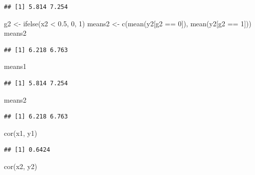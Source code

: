 \documentclass[
]{krantz}
\makeatletter
\newenvironment{Shaded}{\begin{snugshade}}{\end{snugshade}}
\newcommand{\DecValTok}[1]{\textcolor[rgb]{0.06,0.06,0.06}{#1}}
\newcommand{\FloatTok}[1]{\textcolor[rgb]{0.06,0.06,0.06}{#1}}
\newcommand{\FunctionTok}[1]{\textcolor[rgb]{0,0,0}{#1}}
\newcommand{\NormalTok}[1]{#1}
\newcommand{\OtherTok}[1]{\textcolor[rgb]{0.37,0.37,0.37}{#1}}
\newcommand{\SpecialCharTok}[1]{\textcolor[rgb]{0,0,0}{#1}}
\newenvironment{kframe}{%
\medskip{}
\setlength{\fboxsep}{.8em}
 \def\at@end@of@kframe{}%
 \ifinner\ifhmode%
  \def\at@end@of@kframe{\end{minipage}}%
  \begin{minipage}{\columnwidth}%
 \fi\fi%
 \def\FrameCommand##1{\hskip\@totalleftmargin \hskip-\fboxsep
 \colorbox{shadecolor}{##1}\hskip-\fboxsep
     \hskip-\linewidth \hskip-\@totalleftmargin \hskip\columnwidth}%
 \MakeFramed {\advance\hsize-\width
   \@totalleftmargin\z@ \linewidth\hsize
   \@setminipage}}%
 {\par\unskip\endMakeFramed%
 \at@end@of@kframe}
\renewenvironment{Shaded}{\begin{kframe}}{\end{kframe}}
\makeatother
\begin{document}
\begin{verbatim}
## [1] 5.814 7.254
\end{verbatim}

\begin{Shaded}
\begin{Highlighting}[]
\NormalTok{g2 }\OtherTok{\textless{}{-}} \FunctionTok{ifelse}\NormalTok{(x2 }\SpecialCharTok{\textless{}} \FloatTok{0.5}\NormalTok{, }\DecValTok{0}\NormalTok{, }\DecValTok{1}\NormalTok{)}
\NormalTok{means2 }\OtherTok{\textless{}{-}} \FunctionTok{c}\NormalTok{(}\FunctionTok{mean}\NormalTok{(y2[g2 }\SpecialCharTok{==} \DecValTok{0}\NormalTok{]), }\FunctionTok{mean}\NormalTok{(y2[g2 }\SpecialCharTok{==} \DecValTok{1}\NormalTok{]))}
\NormalTok{means2}
\end{Highlighting}
\end{Shaded}

\begin{verbatim}
## [1] 6.218 6.763
\end{verbatim}

\begin{Shaded}
\begin{Highlighting}[]
\NormalTok{means1}
\end{Highlighting}
\end{Shaded}

\begin{verbatim}
## [1] 5.814 7.254
\end{verbatim}

\begin{Shaded}
\begin{Highlighting}[]
\NormalTok{means2}
\end{Highlighting}
\end{Shaded}

\begin{verbatim}
## [1] 6.218 6.763
\end{verbatim}

\begin{Shaded}
\begin{Highlighting}[]
\FunctionTok{cor}\NormalTok{(x1, y1)}
\end{Highlighting}
\end{Shaded}

\begin{verbatim}
## [1] 0.6424
\end{verbatim}

\begin{Shaded}
\begin{Highlighting}[]
\FunctionTok{cor}\NormalTok{(x2, y2)}
\end{Highlighting}
\end{Shaded}
\end{document}
